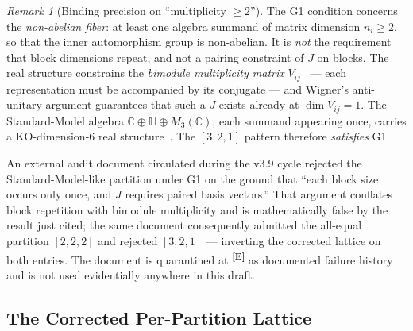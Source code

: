 \documentclass[12pt,a4paper,twoside]{article}
\theoremstyle{plain}
\theoremstyle{definition}
\theoremstyle{remark}
\newtheorem{remark}[theorem]{Remark}
\newcommand{\catmark}[1]{\textsuperscript{\textsf{\textbf{[#1]}}}}
\begin{document}
\begin{remark}[Binding precision on ``multiplicity $\geq 2$'']
\label{rem:multiplicity}
The G1 condition concerns the \emph{non-abelian fiber}: at least one
algebra summand of matrix dimension $n_i \geq 2$, so that the inner
automorphism group is non-abelian. It is \emph{not} the requirement that
block dimensions repeat, and not a pairing constraint of $J$ on blocks.
The real structure constrains the \emph{bimodule multiplicity matrix}
$V_{ij}$~\cite{krajewski1998,paschkesitarz1998,cacic2011} --- each representation must be accompanied by its conjugate ---
and Wigner's anti-unitary argument guarantees that such a $J$ exists
already at $\dim V_{ij} = 1$. The Standard-Model algebra
$\mathbb C \oplus \mathbb H \oplus M_3(\mathbb C)$, each summand appearing
once, carries a KO-dimension-6 real structure~\cite{ccm2007,vansuijlekom2019}. The $[3,2,1]$ pattern
therefore \emph{satisfies} G1.
\end{remark}

An external audit document circulated during the v3.9 cycle rejected the
Standard-Model-like partition under G1 on the ground that ``each block
size occurs only once, and $J$ requires paired basis vectors.'' That
argument conflates block repetition with bimodule multiplicity and is
mathematically false by the result just cited; the same document
consequently admitted the all-equal partition $[2,2,2]$ and rejected
$[3,2,1]$ --- inverting the corrected lattice on both entries. The
document is quarantined at \catmark{E} as documented failure history and
is not used evidentially anywhere in this draft.

\subsection{The Corrected Per-Partition Lattice}
\label{subsec:corrected-lattice}
\end{document}
